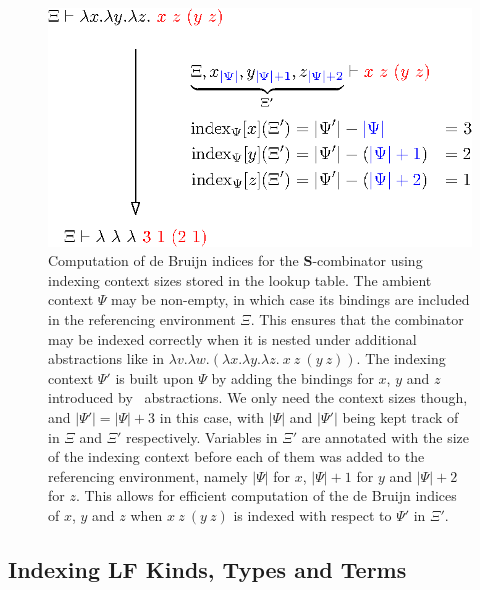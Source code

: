 \begin{figure}[H]
\centering
\includegraphics{figures/lf-indexing.eps}
\caption[Example of de Bruijn indices computation with respect to a lookup table]{%
Computation of de Bruijn indices for the $\mathbf{S}$-combinator using indexing context sizes stored in the lookup table.
The ambient \LF context $\Psi$ may be non-empty, in which case its bindings are included in the referencing environment $\Xi$.
This ensures that the combinator may be indexed correctly when it is nested under additional abstractions like in $\lambda v. \lambda w. (\lambda x. \lambda y. \lambda z.\ x\ z\ (y\ z))$.
The indexing context $\Psi'$ is built upon $\Psi$ by adding the bindings for $x$, $y$ and $z$ introduced by \LF~abstractions.
We only need the context sizes though, and $ |\Psi'| = |\Psi| + 3 $ in this case, with $|\Psi|$ and $|\Psi'|$ being kept track of in $\Xi$ and $\Xi'$ respectively.
Variables in $\Xi'$ are annotated with the size of the \LF indexing context before each of them was added to the referencing environment, namely $|\Psi|$ for $x$, $|\Psi| + 1$ for $y$ and $|\Psi| + 2$ for $z$.
This allows for efficient computation of the de Bruijn indices of $ x $, $ y $ and $ z $ when $x\ z\ (y\ z)$ is indexed with respect to $\Psi'$ in $\Xi'$.
}
\label{figure:lf-indexing}
\end{figure}

\subsection{Indexing \acs{LF} Kinds, Types and Terms}

